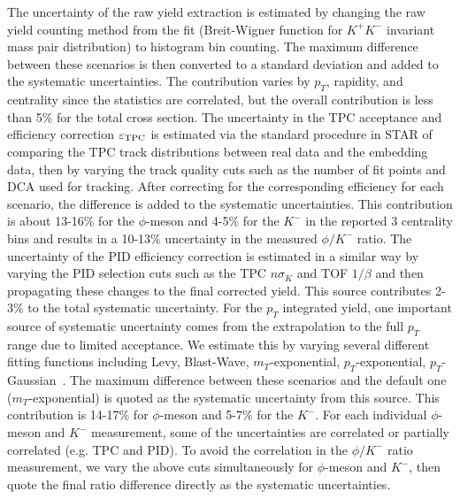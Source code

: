 \documentclass[%
 reprint,	
showpacs,
 amsmath,amssymb,
 aps,
 prc,
]{revtex4-1}
\begin{document}
The uncertainty of the raw yield extraction is estimated by changing the raw yield counting method from the fit (Breit-Wigner function for $K^+K^-$ invariant mass pair distribution) to histogram bin counting. The maximum difference between these scenarios is then converted to a standard deviation and added to the systematic uncertainties. The contribution varies by $p_T$, rapidity, and centrality since the statistics are correlated, but the overall contribution is less than 5\% for the total cross section. The uncertainty in the TPC acceptance and efficiency correction $\varepsilon_{\rm TPC}$ is estimated via the standard procedure in STAR of comparing the TPC track distributions between real data and the embedding data, then by varying the track quality cuts such as the number of fit points and DCA used for tracking. After correcting for the corresponding efficiency for each scenario, the difference is added to the systematic uncertainties. This contribution is about 13-16\% for the $\phi$-meson and 4-5\% for the $K^-$ in the reported 3 centrality bins and results in a 10-13\% uncertainty in the measured $\phi/K^-$ ratio. The uncertainty of the PID efficiency correction is estimated in a similar way by varying the PID selection cuts such as the TPC $n\sigma_{K}$ and TOF $1/\beta$ and then propagating these changes to the final corrected yield. This source contributes 2-3\% to the total systematic uncertainty. For the $p_T$ integrated yield, one important source of systematic uncertainty comes from the extrapolation to the full $p_T$ range due to limited acceptance. We estimate this by varying several different fitting functions including Levy, Blast-Wave, $m_T$-exponential, $p_T$-exponential, $p_T$-Gaussian~\cite{STAR_particleYield}. The maximum difference between these scenarios and the default one ($m_T$-exponential) is quoted as the systematic uncertainty from this source. This contribution is 14-17\% for $\phi$-meson and 5-7\% for the $K^-$. For each individual $\phi$-meson and $K^-$ measurement, some of the uncertainties are correlated or partially correlated (e.g. TPC and PID). To avoid the correlation in the $\phi/K^-$ ratio measurement, we vary the above cuts simultaneously for $\phi$-meson and $K^-$, then quote the final ratio difference directly as the systematic uncertainties.
\end{document}
